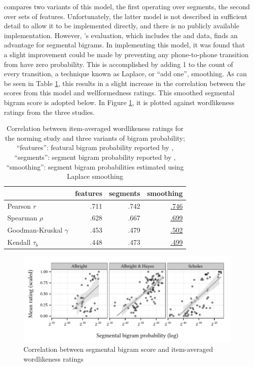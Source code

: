 \citet{Albright2009a} compares two variants of this model, the first operating over segments, the second over sets of features. Unfortunately, the latter model is not described in sufficient detail to allow it to be implemented directly, and there is no publicly available implementation. However, \citeauthor{Albright2009a}'s evaluation, which includes the \citet{Scholes1966} and \citet{Albright2003b} data, finds an advantage for segmental bigrams. In implementing this model, it was found that a slight improvement could be made by preventing any phone-to-phone transition from have zero probability. This is accomplished by adding 1 to the count of every transition, a technique known as Laplace, or ``add one'', smoothing. As can be seen in Table \ref{bigramcomparison}, this results in a slight increase in the correlation between the scores from this model and wellformedness ratings. This smoothed segmental bigram score is adopted below. In Figure \ref{bigram}, it is plotted against wordlikeness ratings from the three studies.

\begin{table}
\centering
\begin{tabular}{l rrr}
\toprule
                         & features & segments & smoothing \\
\midrule
Pearson $r$              & {.711}   & {.742}   & \uline{.746} \\
Spearman $\rho$          & {.628}   & {.667}   & \uline{.699} \\
Goodman-Kruskal $\gamma$ & {.453}   & {.479}   & \uline{.502} \\
Kendall $\tau_{b}$       & {.448}   & {.473}   & \uline{.499} \\
\bottomrule
\end{tabular}
\caption{Correlation between item-averaged wordlikeness ratings for the \citet{Albright2003b} norming study and three variants of bigram probability; ``features'': featural bigram probability reported by \citet{Albright2009a}, ``segments'': segment bigram probability reported by \citet{Albright2009a}, ``smoothing'': segment bigram probabilities estimated using Laplace smoothing}
\label{bigramcomparison}
\end{table}

\begin{figure}
\centering
\includegraphics{bigram.pdf}
\caption{Correlation between segmental bigram score and item-averaged wordlikeness ratings}
\label{bigram}
\end{figure}

